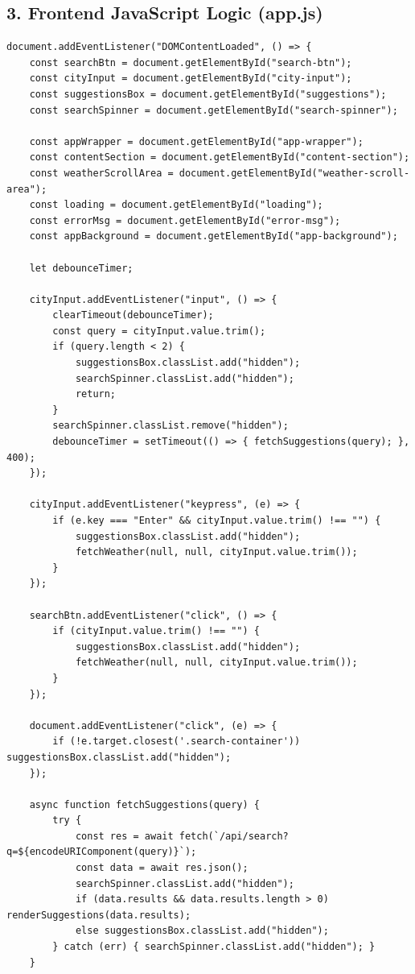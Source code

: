 \documentclass[12pt,a4paper]{article}
\begin{document}
\subsection*{3. Frontend JavaScript Logic (app.js)}
\begin{lstlisting}[caption=Frontend Logic (static/app.js)]
document.addEventListener("DOMContentLoaded", () => {
    const searchBtn = document.getElementById("search-btn");
    const cityInput = document.getElementById("city-input");
    const suggestionsBox = document.getElementById("suggestions");
    const searchSpinner = document.getElementById("search-spinner");
    
    const appWrapper = document.getElementById("app-wrapper");
    const contentSection = document.getElementById("content-section");
    const weatherScrollArea = document.getElementById("weather-scroll-area");
    const loading = document.getElementById("loading");
    const errorMsg = document.getElementById("error-msg");
    const appBackground = document.getElementById("app-background");
    
    let debounceTimer;

    cityInput.addEventListener("input", () => {
        clearTimeout(debounceTimer);
        const query = cityInput.value.trim();
        if (query.length < 2) {
            suggestionsBox.classList.add("hidden");
            searchSpinner.classList.add("hidden");
            return;
        }
        searchSpinner.classList.remove("hidden");
        debounceTimer = setTimeout(() => { fetchSuggestions(query); }, 400);
    });

    cityInput.addEventListener("keypress", (e) => {
        if (e.key === "Enter" && cityInput.value.trim() !== "") {
            suggestionsBox.classList.add("hidden");
            fetchWeather(null, null, cityInput.value.trim());
        }
    });

    searchBtn.addEventListener("click", () => {
        if (cityInput.value.trim() !== "") {
            suggestionsBox.classList.add("hidden");
            fetchWeather(null, null, cityInput.value.trim());
        }
    });

    document.addEventListener("click", (e) => {
        if (!e.target.closest('.search-container')) suggestionsBox.classList.add("hidden");
    });

    async function fetchSuggestions(query) {
        try {
            const res = await fetch(`/api/search?q=${encodeURIComponent(query)}`);
            const data = await res.json();
            searchSpinner.classList.add("hidden");
            if (data.results && data.results.length > 0) renderSuggestions(data.results);
            else suggestionsBox.classList.add("hidden");
        } catch (err) { searchSpinner.classList.add("hidden"); }
    }


\end{lstlisting}
\end{document}
